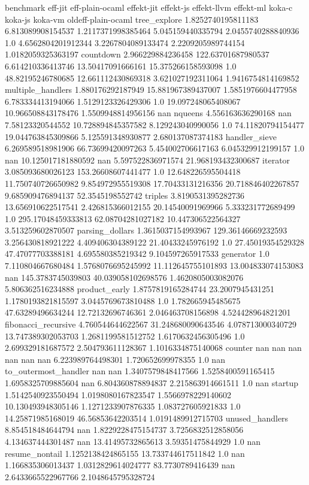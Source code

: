 benchmark	eff-jit	eff-plain-ocaml	effekt-jit	effekt-js	effekt-llvm	effekt-ml	koka-c	koka-js	koka-vm	oldeff-plain-ocaml
tree_explore	1.8252740195811183	6.813089908154537	1.2117371998385464	5.045159440335794	2.0455740288840936	1.0	4.6562804201912344	3.2267804089133474	2.2209205989744154	1.0182059325363197
countdown	2.966229884236458	122.63701687980537	6.614210336413746	13.50417091666161	15.375266158593098	1.0	48.82195246780685	12.661112430869318	3.621027192311064	1.9416754814169852
multiple_handlers	1.880176292187949	15.881967389437007	1.5851976604477958	6.783334413194066	1.5129123326429306	1.0	19.097248065408067	10.966508843178476	1.5509948814956156	nan
nqueens	4.556163636290168	nan	7.58123320544552	10.728894845357582	8.129243040990056	1.0	74.11820794154477	19.044763845309866	5.125591348930877	2.680137087374183
handler_sieve	6.269589518981906	66.73699420097263	5.454002706617163	6.045329912199157	1.0	nan	10.125017181880592	nan	5.597522836971574	21.968193432300687
iterator	3.085093680026123	153.26608607441477	1.0	12.648226595504418	11.750740726650982	9.854972955519308	17.70433131216356	20.718846402267857	9.685909476894137	52.3545198552742
triples	3.8190531395282736	13.656910622517541	2.426815366012155	20.14540091969966	5.333231772689499	1.0	295.17048459333813	62.08704281027182	10.447306522564327	3.513259602870507
parsing_dollars	1.3615037154993967	129.36146669232593	3.256430818921222	4.409406304389122	21.40433245976192	1.0	27.45019354529328	47.47077703388181	4.695580385219342	9.104597265917533
generator	1.0	7.110804667680484	1.5768076695245992	11.112645755101893	13.004833074153083	nan	145.3783745039803	40.039058102698576	1.4620805003082076	5.806362516234888
product_early	1.8757819165284744	23.2007945431251	1.1780193821815597	3.0445769673810488	1.0	1.782665945485675	47.63289496634244	12.72132696746361	2.046463708156898	4.524428964821201
fibonacci_recursive	4.760544644622567	31.248680090643546	4.078713000340729	13.747389302053703	1.2681199581512752	1.6170632456305496	1.0	2.699329181687572	2.504793611128367	1.1016334875140068
counter	nan	nan	nan	nan	nan	nan	6.223989764498301	1.720652699978355	1.0	nan
to_outermost_handler	nan	nan	1.3407579848417566	1.5258400591165415	1.6958325709885604	nan	6.804360878894837	2.215863914661511	1.0	nan
startup	1.5142540923550494	1.0198080167823547	1.5566978229140602	10.130493948305146	1.1271233907876335	1.083727605921833	1.0	14.25871985168019	46.56853642203514	1.0191489912715703
unused_handlers	8.854518484644794	nan	1.8229228475154737	3.7256832512858056	4.134637444301487	nan	13.41495732865613	3.59351475844929	1.0	nan
resume_nontail	1.1252138424865155	13.733744617511842	1.0	nan	1.166835306013437	1.0312829614024777	83.7730789416439	nan	2.6433665522967766	2.1048645795328724